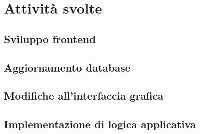 
\section{Attività svolte}

    \subsection{Sviluppo frontend}
    \subsection{Aggiornamento database}
    \subsection{Modifiche all’interfaccia grafica}
    \subsection{Implementazione di logica applicativa}